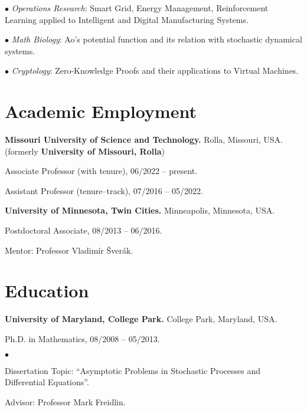 \documentclass[margin,line]{res}
\newenvironment{list1}{
  \begin{list}{\ding{113}}{%
      \setlength{\itemsep}{0in}
      \setlength{\parsep}{0in} \setlength{\parskip}{0in}
      \setlength{\topsep}{0in} \setlength{\partopsep}{0in}
      \setlength{\leftmargin}{0.17in}}}{\end{list}}
\newenvironment{list2}{
  \begin{list}{$\bullet$}{%
      \setlength{\itemsep}{0in}
      \setlength{\parsep}{0in} \setlength{\parskip}{0in}
      \setlength{\topsep}{0in} \setlength{\partopsep}{0in}
      \setlength{\leftmargin}{0.2in}}}{\end{list}}
\begin{document}
\begin{resume}
$\bullet$ \textit{Operations Research}: Smart Grid, Energy Management, Reinforcement Learning applied to Intelligent and Digital Manufacturing Systems.

$\bullet$ \textit{Math Biology}: Ao's potential function and its relation with stochastic dynamical systems.

$\bullet$ \textit{Cryptology}: Zero-Knowledge Proofs and their applications to Virtual Machines.

\section{\sc Academic Employment}
{\bf Missouri University of Science and Technology.} \hfill Rolla, Missouri, USA. \\
(formerly {\bf University of Missouri, Rolla})
\vspace*{-0.05in}

Associate Professor (with tenure), \hfill 06/2022 -- present.

\vspace*{-0.1in}

Assistant Professor (tenure--track), \hfill 07/2016 -- 05/2022.


{\bf University of Minnesota, Twin Cities.} \hfill Minneapolis, Minnesota, USA. \\
\vspace*{-0.25in}

Postdoctoral Associate, \hfill 08/2013 -- 06/2016.

\begin{list1}
\vspace*{.05in}
\item[] Mentor: Professor Vladim\'{i}r \v{S}ver\'{a}k.
\end{list1}



\section{\sc Education}

{\bf University of Maryland, College Park.} \hfill College Park, Maryland, USA.\\
\vspace*{-.25in}

Ph.D. in Mathematics, \hfill 08/2008 -- 05/2013.

\begin{list2}
\vspace*{.05in}
\item[] Dissertation Topic:  ``Asymptotic Problems in Stochastic Processes and
Differential Equations''.
\item[] Advisor:  Professor Mark Freidlin.
\end{list2}


\end{resume}
\end{document}

